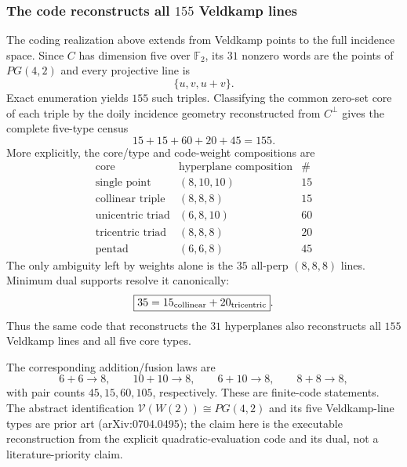 \subsubsection{The code reconstructs all $155$ Veldkamp lines}
\label{sec:doily-code-veldkamp-lines}

The coding realization above extends from Veldkamp points to the full incidence
space. Since $C$ has dimension five over $\mathbb F_2$, its $31$ nonzero words
are the points of $PG(4,2)$ and every projective line is
\[
 \{u,v,u+v\}.
\]
Exact enumeration yields $155$ such triples. Classifying the common zero-set
core of each triple by the doily incidence geometry reconstructed from
$C^\perp$ gives the complete five-type census
\[
 \boxed{15+15+60+20+45=155}.
\]
More explicitly, the core/type and code-weight compositions are
\[
\begin{array}{c|c|c}
\text{core} & \text{hyperplane composition} & \#\\ \hline
\text{single point} & (8,10,10) & 15\\
\text{collinear triple} & (8,8,8) & 15\\
\text{unicentric triad} & (6,8,10) & 60\\
\text{tricentric triad} & (8,8,8) & 20\\
\text{pentad} & (6,6,8) & 45
\end{array}
\]
The only ambiguity left by weights alone is the $35$ all-perp
$(8,8,8)$ lines. Minimum dual supports resolve it canonically:
\[
 \boxed{35=15_{\rm collinear}+20_{\rm tricentric}}.
\]
Thus the same code that reconstructs the $31$ hyperplanes also reconstructs
all $155$ Veldkamp lines and all five core types.

The corresponding addition/fusion laws are
\[
6+6\to8,\qquad10+10\to8,\qquad6+10\to8,\qquad8+8\to8,
\]
with pair counts $45,15,60,105$, respectively. These are finite-code
statements. The abstract identification $\mathcal V(W(2))\cong PG(4,2)$ and
its five Veldkamp-line types are prior art (arXiv:0704.0495); the claim here is
the executable reconstruction from the explicit quadratic-evaluation code and
its dual, not a literature-priority claim.
